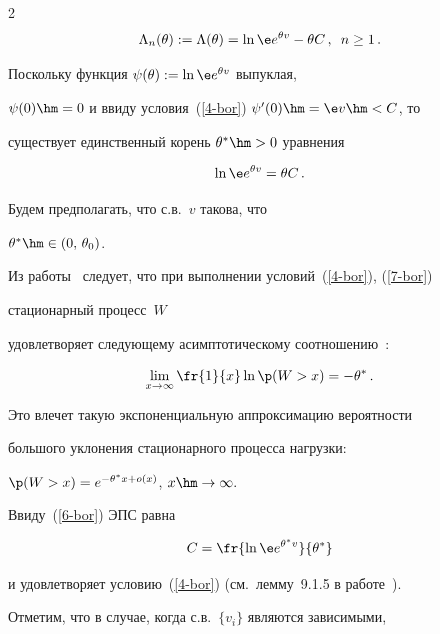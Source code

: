 \begin{multicols}{2}
\begin{equation*}
\Lambda_n(\theta):=\Lambda(\theta)=\ln \e e^{\theta v}-\theta C\,,\enskip

n\ge 1\,. %

\end{equation*}

Поскольку  функция $\psi(\theta):=\ln \e e^{\theta v}$  выпуклая,

$\psi(0)\hm=0$ и ввиду   условия~(\ref{4-bor})  $\psi^{\prime}(0)\hm=\e v\hm<C$, то

существует   единственный корень $\theta^*\hm>0$ уравнения

\begin{equation}

\ln \e e^{\theta v}=\theta C\,. \label{6-bor}

\end{equation}

   Будем предполагать, что с.в.~$v$ такова, что

 $\theta^*\hm\in (0,\,\theta_0)$.

Из работы~\cite{Glynn} следует, что при выполнении  условий~(\ref{4-bor}), (\ref{7-bor})

 стационарный процесс~$W$

 удовлетворяет   следующему асимптотическому соотношению~\cite{Ganesh, Glynn}:

\begin{equation}

\lim\limits_ {x\to \infty}\fr{1}{x}\ln \p(W> x)=-\theta^*\,. \label{10b-bor}

\end{equation}

Это  влечет такую экспоненциальную аппроксимацию  вероятности

большого уклонения стационарного процесса нагрузки:


 $\p(W> x)=e^{-\theta^*x+o(x)}$, $x\hm\to \infty.$

 Ввиду~(\ref{6-bor}) ЭПС равна

\begin{equation}

C=\fr{\ln\e e ^{\theta^* v}}{\theta^*} \label{12b-bor}

\end{equation}

и удовлетворяет условию~(\ref{4-bor}) (см.\ лемму~9.1.5 в работе~\cite{Chang}).



Отметим, что в  случае, когда с.в.\ $\{v_i\}$ являются зависимыми,


\end{multicols}

